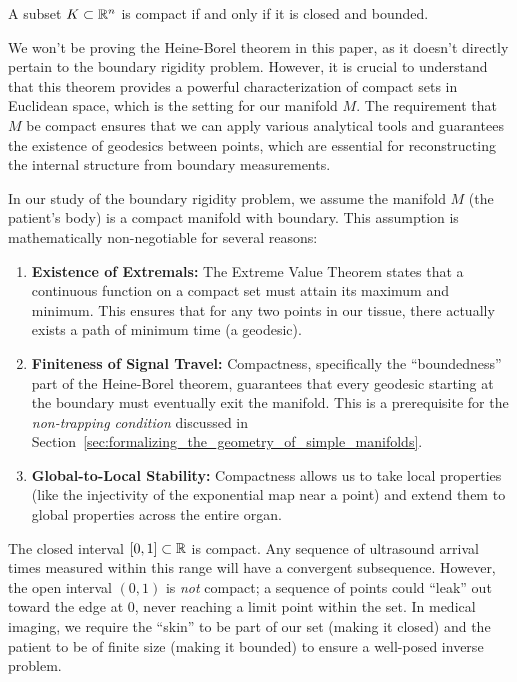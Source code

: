 \begin{theorem}
  A subset $K \subset \mathbb{R}^n$ is compact if and only if it is closed and bounded.
\end{theorem}

\begin{note}
  We won't be proving the Heine-Borel theorem in this paper, as it doesn't directly pertain to the boundary rigidity problem. However, it is crucial to understand that this theorem provides a powerful characterization of compact sets in Euclidean space, which is the setting for our manifold $M$. The requirement that $M$ be compact ensures that we can apply various analytical tools and guarantees the existence of geodesics between points, which are essential for reconstructing the internal structure from boundary measurements.
\end{note}

In our study of the boundary rigidity problem, we assume the manifold $M$ (the patient's body) is a compact manifold with boundary. This assumption is mathematically non-negotiable for several reasons:

\begin{enumerate}
  \item \textbf{Existence of Extremals:} The Extreme Value Theorem states that a continuous function on a compact set must attain its maximum and minimum. This ensures that for any two points in our tissue, there actually exists a path of minimum time (a geodesic).
  \item \textbf{Finiteness of Signal Travel:} Compactness, specifically the ``boundedness'' part of the Heine-Borel theorem, guarantees that every geodesic starting at the boundary must eventually exit the manifold. This is a prerequisite for the \emph{non-trapping condition} discussed in Section~\ref{sec:formalizing_the_geometry_of_simple_manifolds}.
  \item \textbf{Global-to-Local Stability:} Compactness allows us to take local properties (like the injectivity of the exponential map near a point) and extend them to global properties across the entire organ.
\end{enumerate}

\begin{example}
  The closed interval $[0, 1] \subset \mathbb{R}$ is compact. Any sequence of ultrasound arrival times measured within this range will have a convergent subsequence. However, the open interval $(0, 1)$ is \emph{not} compact; a sequence of points could ``leak'' out toward the edge at $0$, never reaching a limit point within the set. In medical imaging, we require the ``skin'' to be part of our set (making it closed) and the patient to be of finite size (making it bounded) to ensure a well-posed inverse problem.
\end{example}

